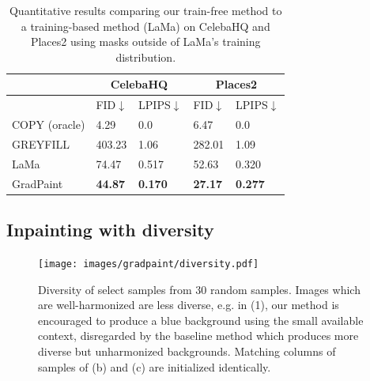 \begin{table}[]
\begin{tabular}{|l|ll|ll|}
\hline
                   & \multicolumn{2}{c|}{CelebaHQ} & \multicolumn{2}{c|}{Places2} \\ \hline
                   & \multicolumn{1}{l|}{FID$\downarrow$}             & LPIPS$\downarrow$          & \multicolumn{1}{l|}{FID$\downarrow$}            & LPIPS$\downarrow$          \\ \hline
\rowcolor[gray]{0.7}
COPY (oracle)               & \multicolumn{1}{l|}{4.29}           & 0.0          & \multicolumn{1}{l|}{6.47}          & 0.0          \\ \hline

GREYFILL               & \multicolumn{1}{l|}{403.23}           & 1.06          & \multicolumn{1}{l|}{282.01}          & 1.09          \\ \Xhline{4\arrayrulewidth}

LaMa               & \multicolumn{1}{l|}{74.47}           & 0.517          & \multicolumn{1}{l|}{52.63}          & 0.320          \\ \hline

GradPaint & \multicolumn{1}{l|}{\textbf{44.87}}  & \textbf{0.170} & \multicolumn{1}{l|}{\textbf{27.17}} & \textbf{0.277} \\ \hline

\end{tabular}
\caption{Quantitative results comparing our train-free method to a training-based method (LaMa) on CelebaHQ and Places2 using masks outside of LaMa's training distribution.}
\label{abnormal_tab}
\end{table}



\subsection{Inpainting with diversity}






\begin{figure}[htbp]
  \centering
    \texttt{[image: images/gradpaint/diversity.pdf]}
    \caption{Diversity of select samples from 30 random samples. Images which are well-harmonized are less diverse, e.g. in (1), our method is encouraged to produce a blue background using the small available context, disregarded by the baseline method which produces more diverse but unharmonized backgrounds. Matching columns of samples of (b) and (c) are initialized identically.}
    \label{fig:diversity}
\end{figure}

